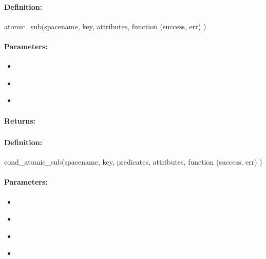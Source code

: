 \paragraph{Definition:}
\begin{javascriptcode}
atomic_sub(spacename, key, attributes, function (success, err) {})
\end{javascriptcode}
\paragraph{Parameters:}
\begin{itemize}[noitemsep]
\item {}\\

\item {}\\

\item {}\\

\end{itemize}

\paragraph{Returns:}


\pagebreak
\subsubsection{}
\label{api:nodejs:cond_atomic_sub}


\paragraph{Definition:}
\begin{javascriptcode}
cond_atomic_sub(spacename, key, predicates, attributes, function (success, err) {})
\end{javascriptcode}
\paragraph{Parameters:}
\begin{itemize}[noitemsep]
\item {}\\

\item {}\\

\item {}\\

\item {}\\

\end{itemize}

